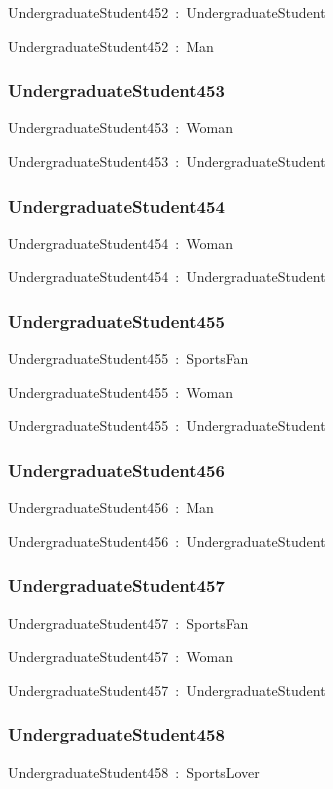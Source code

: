 \documentclass{article}
\begin{document}
UndergraduateStudent452~:~UndergraduateStudent

UndergraduateStudent452~:~Man

\subsubsection*{UndergraduateStudent453}

UndergraduateStudent453~:~Woman

UndergraduateStudent453~:~UndergraduateStudent

\subsubsection*{UndergraduateStudent454}

UndergraduateStudent454~:~Woman

UndergraduateStudent454~:~UndergraduateStudent

\subsubsection*{UndergraduateStudent455}

UndergraduateStudent455~:~SportsFan

UndergraduateStudent455~:~Woman

UndergraduateStudent455~:~UndergraduateStudent

\subsubsection*{UndergraduateStudent456}

UndergraduateStudent456~:~Man

UndergraduateStudent456~:~UndergraduateStudent

\subsubsection*{UndergraduateStudent457}

UndergraduateStudent457~:~SportsFan

UndergraduateStudent457~:~Woman

UndergraduateStudent457~:~UndergraduateStudent

\subsubsection*{UndergraduateStudent458}

UndergraduateStudent458~:~SportsLover
\end{document}
